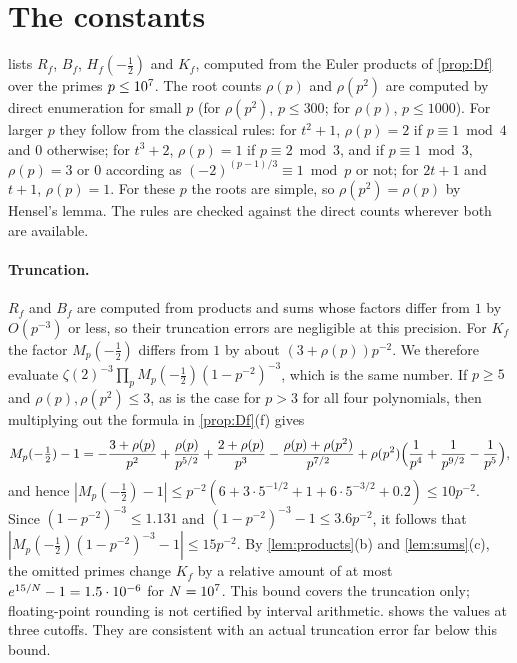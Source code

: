 \section{The constants}

 lists $R_f$, $B_f$, $H_f(-\frac12)$ and $K_f$, computed from the Euler products of \cref{prop:Df} over the primes $p\le\Pmax$. The root counts $\rho(p)$ and $\rho(p^2)$ are computed by direct enumeration for small $p$ (for $\rho(p^2)$, $p\le300$; for $\rho(p)$, $p\le1000$). For larger $p$ they follow from the classical rules: for $t^2+1$, $\rho(p)=2$ if $p\equiv1\bmod4$ and $0$ otherwise; for $t^3+2$, $\rho(p)=1$ if $p\equiv2\bmod3$, and if $p\equiv1\bmod3$, $\rho(p)=3$ or $0$ according as $(-2)^{(p-1)/3}\equiv1\bmod p$ or not; for $2t+1$ and $t+1$, $\rho(p)=1$. For these $p$ the roots are simple, so $\rho(p^2)=\rho(p)$ by Hensel's lemma. The rules are checked against the direct counts wherever both are available.

\begin{table}[ht]
\centering

\caption{Constants of \cref{thm:main}, Euler products over $p\le\Pmax$. The row $f(t)=t+1$ is the comparison of \cref{rem:vaughan}.}\label{tab:constants}
\end{table}

\paragraph{Truncation.} $R_f$ and $B_f$ are computed from products and sums whose factors differ from $1$ by $O(p^{-3})$ or less, so their truncation errors are negligible at this precision. For $K_f$ the factor $M_p(-\frac12)$ differs from $1$ by about $(3+\rho(p))p^{-2}$. We therefore evaluate $\zeta(2)^{-3}\prod_pM_p(-\frac12)(1-p^{-2})^{-3}$, which is the same number. If $p\ge5$ and $\rho(p),\rho(p^2)\le3$, as is the case for $p>3$ for all four polynomials, then multiplying out the formula in \cref{prop:Df}(f) gives
\[
M_p(-\tfrac12)-1=-\frac{3+\rho(p)}{p^2}+\frac{\rho(p)}{p^{5/2}}+\frac{2+\rho(p)}{p^3}-\frac{\rho(p)+\rho(p^2)}{p^{7/2}}+\rho(p^2)\Bigl(\frac1{p^4}+\frac1{p^{9/2}}-\frac1{p^5}\Bigr),
\]
and hence $|M_p(-\frac12)-1|\le p^{-2}(6+3\cdot5^{-1/2}+1+6\cdot5^{-3/2}+0.2)\le10p^{-2}$. Since $(1-p^{-2})^{-3}\le1.131$ and $(1-p^{-2})^{-3}-1\le3.6p^{-2}$, it follows that $|M_p(-\frac12)(1-p^{-2})^{-3}-1|\le15p^{-2}$. By \cref{lem:products}(b) and \cref{lem:sums}(c), the omitted primes change $K_f$ by a relative amount of at most $e^{15/N}-1=1.5\cdot10^{-6}$ for $N=10^{7}$. This bound covers the truncation only; floating-point rounding is not certified by interval arithmetic.  shows the values at three cutoffs. They are consistent with an actual truncation error far below this bound.

